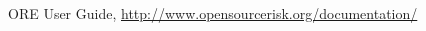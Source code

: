 \documentclass[12pt, a4paper]{article}
\begin{document}


\begin{thebibliography}{1}

 ORE User Guide, \url{http://www.opensourcerisk.org/documentation/}

\end{thebibliography}
\end{document}
